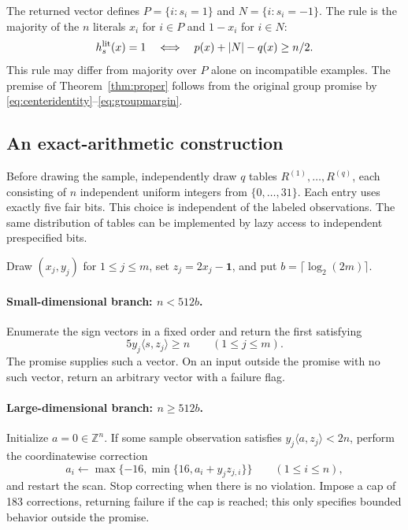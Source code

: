 \documentclass[11pt,a4paper]{article}
\theoremstyle{remark}
\newcommand{\ip}[2]{\langle #1,#2\rangle}
\newcommand{\1}{\mathbf 1}
\begin{document}
The returned vector defines $P=\{i:s_i=1\}$ and $N=\{i:s_i=-1\}$.
The rule is the majority of the $n$ literals $x_i$ for $i\in P$ and
$1-x_i$ for $i\in N$:
\begin{equation}\label{eq:literalrule}
 h_s^{\rm lit}(x)=1
 \quad\Longleftrightarrow\quad
 p(x)+|N|-q(x)\ge n/2.
\end{equation}
This rule may differ from majority over $P$ alone on incompatible examples.
The premise of Theorem~\ref{thm:proper} follows from the original group
promise by \eqref{eq:centeridentity}--\eqref{eq:groupmargin}.

\subsection{An exact-arithmetic construction}

Before drawing the sample, independently draw $q$ tables
$R^{(1)},\ldots,R^{(q)}$, each consisting of $n$ independent uniform integers
from $\{0,\ldots,31\}$. Each entry uses exactly five fair bits. This choice is
independent of the labeled observations. The same distribution of tables can
be implemented by lazy access to independent prespecified bits.

Draw $(x_j,y_j)$ for $1\le j\le m$, set $z_j=2x_j-\1$, and put
$b=\lceil\log_2(2m)\rceil$.

\paragraph{Small-dimensional branch: $n<512b$.}
Enumerate the sign vectors in a fixed order and return the first satisfying
\begin{equation}\label{eq:properenum}
 5y_j\ip{s}{z_j}\ge n\qquad(1\le j\le m).
\end{equation}
The promise supplies such a vector. On an input outside the promise with no
such vector, return an arbitrary vector with a failure flag.

\paragraph{Large-dimensional branch: $n\ge512b$.}
Initialize $a=0\in\mathbb Z^n$. If some sample observation satisfies
$y_j\ip{a}{z_j}<2n$, perform the coordinatewise correction
\begin{equation}\label{eq:clip}
 a_i\longleftarrow
 \max\{-16,\min\{16,a_i+y_jz_{j,i}\}\}\qquad(1\le i\le n),
\end{equation}
and restart the scan. Stop correcting when there is no violation. Impose a
cap of 183 corrections, returning failure if the cap is reached;
this only specifies bounded behavior outside the promise.
\end{document}
